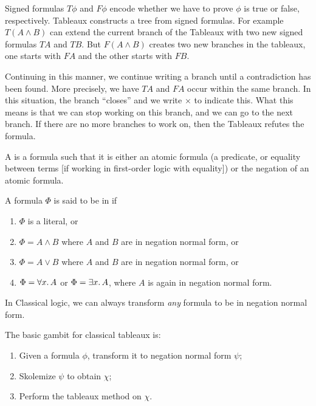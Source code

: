 \begin{node}
Signed formulas $T\phi$ and $F\phi$ encode whether we have to prove
$\phi$ is true or false, respectively. Tableaux constructs a tree from
signed formulas. For example $T(A\land B)$ can extend the current
branch of the Tableaux with two new signed formulas $TA$ and $TB$. But
$F(A\land B)$ creates two new branches in the tableaux, one starts
with $FA$ and the other starts with $FB$.

Continuing in this manner, we continue writing a branch until a
contradiction has been found. More precisely, we have $TA$ and $FA$
occur within the same branch. In this situation, the branch ``closes''
and we write $\times$ to indicate this. What this means is that we
can stop working on this branch, and we can go to the next branch. If
there are no more branches to work on, then the Tableaux refutes the formula.
\end{node}


\begin{definition}
A  is a formula such that it is either an atomic formula
(a predicate, or equality between terms [if working in first-order logic
  with equality])
or the negation of an atomic formula.
\end{definition}

\begin{definition}
A formula $\Phi$ is said to be in  if
\begin{enumerate}
\item $\Phi$ is a literal, or
\item $\Phi=A\land B$ where $A$ and $B$ are in negation normal form,
  or
\item $\Phi=A\lor B$ where $A$ and $B$ are in negation normal form, or
\item $\Phi=\forall x\ldotp A$ or $\Phi=\exists x\ldotp A$, where $A$ is again in negation normal form.
\end{enumerate}
In Classical logic, we can always transform \emph{any} formula to be
in negation normal form.
\end{definition}

\begin{node}
The basic gambit for classical tableaux is:
\begin{enumerate}
\item Given a formula $\phi$, transform it to negation normal form $\psi$;
\item Skolemize $\psi$ to obtain $\chi$;
\item Perform the tableaux method on $\chi$.
\end{enumerate}
\end{node}

